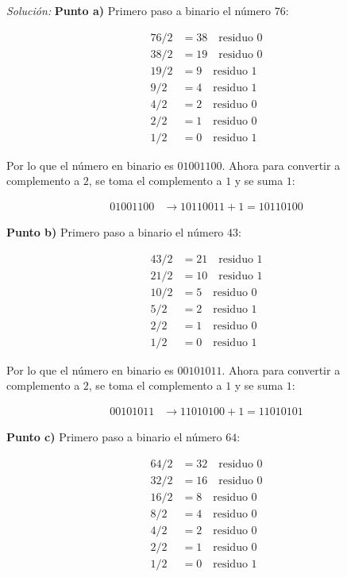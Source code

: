 \documentclass{article}
\newenvironment{solution}
    {\textit{Solución:}}
    {}
\begin{document}
\begin{solution}
\textbf{Punto a)}
Primero paso a binario el número $76$:

\begin{align*}
    76/2 &= 38 \quad \text{residuo } 0\\
    38/2 &= 19 \quad \text{residuo } 0\\
    19/2 &= 9 \quad \text{residuo } 1\\
    9/2 &= 4 \quad \text{residuo } 1\\
    4/2 &= 2 \quad \text{residuo } 0\\
    2/2 &= 1 \quad \text{residuo } 0\\
    1/2 &= 0 \quad \text{residuo } 1
\end{align*}

Por lo que el número en binario es $01001100$. Ahora para convertir a complemento a $2$, se toma el complemento a $1$ y se suma $1$:

\begin{align*}
    01001100 &\rightarrow 10110011 + 1 = 10110100
\end{align*}

\textbf{Punto b)}
Primero paso a binario el número $43$:

\begin{align*}
    43/2 &= 21 \quad \text{residuo } 1\\
    21/2 &= 10 \quad \text{residuo } 1\\
    10/2 &= 5 \quad \text{residuo } 0\\
    5/2 &= 2 \quad \text{residuo } 1\\
    2/2 &= 1 \quad \text{residuo } 0\\
    1/2 &= 0 \quad \text{residuo } 1
\end{align*}

Por lo que el número en binario es $00101011$. Ahora para convertir a complemento a $2$, se toma el complemento a $1$ y se suma $1$:

\begin{align*}
    00101011 &\rightarrow 11010100 + 1 = 11010101
\end{align*}

\textbf{Punto c)}
Primero paso a binario el número $64$:

\begin{align*}
    64/2 &= 32 \quad \text{residuo } 0\\
    32/2 &= 16 \quad \text{residuo } 0\\
    16/2 &= 8 \quad \text{residuo } 0\\
    8/2 &= 4 \quad \text{residuo } 0\\
    4/2 &= 2 \quad \text{residuo } 0\\
    2/2 &= 1 \quad \text{residuo } 0\\
    1/2 &= 0 \quad \text{residuo } 1
\end{align*}


\end{solution}
\end{document}
